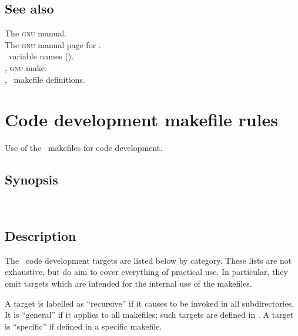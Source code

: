 \subsection*{See also}

The \textsc{gnu}  manual.\\
The \textsc{gnu} manual page for .\\
\aipspp\ variable names ().\\
, \textsc{gnu} make.\\
, \aipspp\ makefile definitions.


\newpage
\section{Code development makefile rules}
\label{Code development makefile rules}

Use of the \aipspp\ makefiles for code development.

\subsection*{Synopsis}

\begin{synopsis}
   \\
\end{synopsis}

\subsection*{Description}

The \aipspp\ code development targets are listed below by category.  These
lists are not exhaustive, but do aim to cover everything of practical use.  In
particular, they omit targets which are intended for the internal use of the
makefiles.

A target is labelled as ``recursive'' if it causes  to be
invoked in all subdirectories.  It is ``general'' if it applies to all
makefiles; such targets are defined in .  A target is
``specific'' if defined in a specific makefile.

